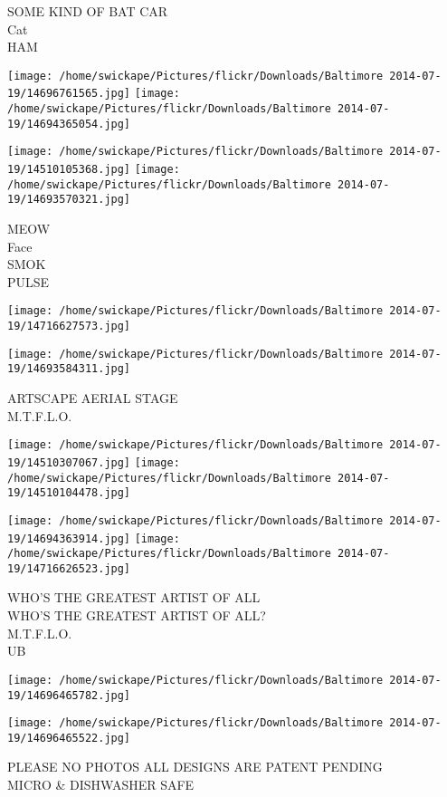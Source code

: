\documentclass[10pt,letterpaper]{article}
\begin{document}
SOME KIND OF BAT CAR\\
Cat\\
HAM
\pagebreak

\texttt{[image: /home/swickape/Pictures/flickr/Downloads/Baltimore 2014-07-19/14696761565.jpg]}
\texttt{[image: /home/swickape/Pictures/flickr/Downloads/Baltimore 2014-07-19/14694365054.jpg]}

\texttt{[image: /home/swickape/Pictures/flickr/Downloads/Baltimore 2014-07-19/14510105368.jpg]}
\texttt{[image: /home/swickape/Pictures/flickr/Downloads/Baltimore 2014-07-19/14693570321.jpg]}

MEOW\\
Face\\
SMOK\\
PULSE
\pagebreak

\texttt{[image: /home/swickape/Pictures/flickr/Downloads/Baltimore 2014-07-19/14716627573.jpg]}

\vspace{0.25in}
\texttt{[image: /home/swickape/Pictures/flickr/Downloads/Baltimore 2014-07-19/14693584311.jpg]}

ARTSCAPE AERIAL STAGE\\
M.T.F.L.O.
\pagebreak

\texttt{[image: /home/swickape/Pictures/flickr/Downloads/Baltimore 2014-07-19/14510307067.jpg]}
\texttt{[image: /home/swickape/Pictures/flickr/Downloads/Baltimore 2014-07-19/14510104478.jpg]}

\texttt{[image: /home/swickape/Pictures/flickr/Downloads/Baltimore 2014-07-19/14694363914.jpg]}
\texttt{[image: /home/swickape/Pictures/flickr/Downloads/Baltimore 2014-07-19/14716626523.jpg]}

WHO'S THE GREATEST ARTIST OF ALL\\
WHO'S THE GREATEST ARTIST OF ALL?\\
M.T.F.L.O.\\
UB
\pagebreak

\texttt{[image: /home/swickape/Pictures/flickr/Downloads/Baltimore 2014-07-19/14696465782.jpg]}

\vspace{0.25in}
\texttt{[image: /home/swickape/Pictures/flickr/Downloads/Baltimore 2014-07-19/14696465522.jpg]}

PLEASE NO PHOTOS ALL DESIGNS ARE PATENT PENDING\\
MICRO \& DISHWASHER SAFE
\pagebreak
\end{document}
